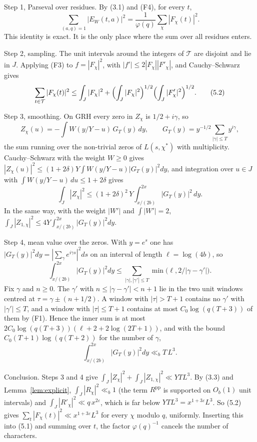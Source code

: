 \documentclass[11pt]{amsart}
\makeatletter
\theoremstyle{definition}
\numberwithin{equation}{section}
\renewenvironment{proof}[1][\proofname]{\par\pushQED{\qed}\normalfont\topsep6\p@\@plus6\p@\relax\trivlist\item[\hskip\labelsep\upshape#1.]\ignorespaces}{\popQED\endtrivlist\@endpefalse}
\newcommand{\cT}{\mathcal{T}}
\makeatother
\begin{document}
\begin{proof}
Step 1, Parseval over residues. By (3.1) and (F4), for every $t$,
\[
\sum_{(a,q)=1}|E_W(t,a)|^2=\frac1{\varphi(q)}\sum_\chi|F_\chi(t)|^2.
\tag{5.1}
\]
This identity is exact. It is the only place where the sum over all residues enters.

Step 2, sampling. The unit intervals around the integers of $\cT$ are disjoint and lie in $J$. Applying (F3) to $f=|F_\chi|^2$, with $|f'|\le2|F_\chi||F'_\chi|$, and Cauchy--Schwarz gives
\[
\sum_{t\in\cT}|F_\chi(t)|^2\le\int_J|F_\chi|^2+\Bigl(\int_J|F_\chi|^2\Bigr)^{1/2}\Bigl(\int_J|F'_\chi|^2\Bigr)^{1/2}.
\tag{5.2}
\]

Step 3, smoothing. On GRH every zero in $Z_\chi$ is $1/2+i\gamma$, so
\[
Z_\chi(u)=-\int W(y/Y-u)\,G_T(y)\,dy,\qquad G_T(y)=y^{-1/2}\sum_{|\gamma|\le T}y^{i\gamma},
\]
the sum running over the non-trivial zeros of $L(s,\chi^*)$ with multiplicity. Cauchy--Schwarz with the weight $W\ge0$ gives $|Z_\chi(u)|^2\le(1+2\delta)Y\int W(y/Y-u)|G_T(y)|^2dy$, and integration over $u\in J$ with $\int W(y/Y-u)\,du\le1+2\delta$ gives
\[
\int_J|Z_\chi|^2\le(1+2\delta)^2\,Y\int_{x/(2b)}^{2x}|G_T(y)|^2\,dy.
\]
In the same way, with the weight $|W'|$ and $\int|W'|=2$, $\int_J|Z_{1,\chi}|^2\le4Y\int_{x/(2b)}^{2x}|G_T(y)|^2dy$.

Step 4, mean value over the zeros. With $y=e^s$ one has $|G_T(y)|^2dy=|\sum_\gamma e^{i\gamma s}|^2ds$ on an interval of length $\ell=\log(4b)$, so
\[
\int_{x/(2b)}^{2x}|G_T(y)|^2dy\le\sum_{|\gamma|,|\gamma'|\le T}\min\bigl(\ell,2/|\gamma-\gamma'|\bigr).
\]
Fix $\gamma$ and $n\ge0$. The $\gamma'$ with $n\le|\gamma-\gamma'|<n+1$ lie in the two unit windows centred at $\tau=\gamma\pm(n+1/2)$. A window with $|\tau|>T+1$ contains no $\gamma'$ with $|\gamma'|\le T$, and a window with $|\tau|\le T+1$ contains at most $C_0\log(q(T+3))$ of them by (F1). Hence the inner sum is at most $2C_0\log(q(T+3))(\ell+2+2\log(2T+1))$, and with the bound $C_0(T+1)\log(q(T+2))$ for the number of $\gamma$,
\[
\int_{x/(2b)}^{2x}|G_T(y)|^2dy\ll_bT\,L^3.
\tag{5.3}
\]

Conclusion. Steps 3 and 4 give $\int_J|Z_\chi|^2+\int_J|Z_{1,\chi}|^2\ll YTL^3$. By (3.3) and Lemma~\ref{lem:explicit}, $\int_J|R_\chi|^2\ll_b1$ (the term $R^{\mathrm{pp}}$ is supported on $O_b(1)$ unit intervals) and $\int_J|R'_\chi|^2\ll q\,x^{2\varepsilon}$, which is far below $YTL^3=x^{1+3\varepsilon}L^3$. So (5.2) gives $\sum_t|F_\chi(t)|^2\ll x^{1+3\varepsilon}L^3$ for every $\chi$ modulo $q$, uniformly. Inserting this into (5.1) and summing over $t$, the factor $\varphi(q)^{-1}$ cancels the number of characters.
\end{proof}
\end{document}
